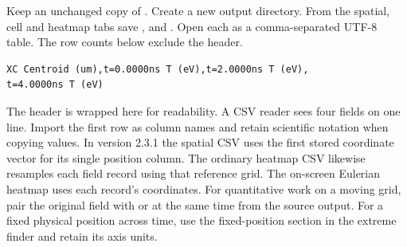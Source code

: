 Keep an unchanged copy of . Create a new output directory. From the spatial, cell and heatmap tabs save ,  and . Open each as a comma-separated UTF-8 table. The row counts below exclude the header.
\begin{verbatim}
XC Centroid (um),t=0.0000ns T (eV),t=2.0000ns T (eV),
t=4.0000ns T (eV)
\end{verbatim}
The header is wrapped here for readability. A CSV reader sees four fields on one line. Import the first row as column names and retain scientific notation when copying values.
In version 2.3.1 the spatial CSV uses the first stored coordinate vector for its single position column. The ordinary heatmap CSV likewise resamples each field record using that reference grid. The on-screen Eulerian heatmap uses each record's coordinates. For quantitative work on a moving grid, pair the original field with  or  at the same time from the source output. For a fixed physical position across time, use the fixed-position section in the extreme finder and retain its axis units.


